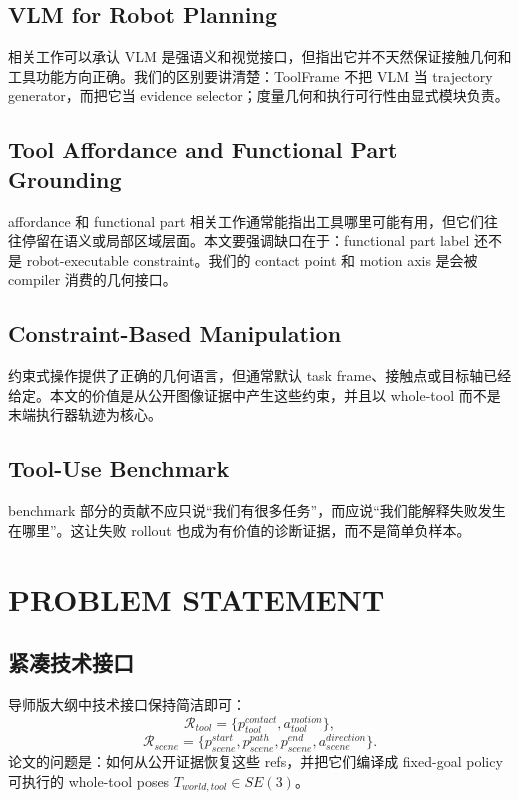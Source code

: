 \documentclass[letterpaper, 10 pt, conference]{ieeeconf}
\newcommand{\method}{ToolFrame}
\begin{document}
\subsection{VLM for Robot Planning}
相关工作可以承认 VLM 是强语义和视觉接口，但指出它并不天然保证接触几何和工具功能方向正确。我们的区别要讲清楚：\method{} 不把 VLM 当 trajectory generator，而把它当 evidence selector；度量几何和执行可行性由显式模块负责。

\subsection{Tool Affordance and Functional Part Grounding}
affordance 和 functional part 相关工作通常能指出工具哪里可能有用，但它们往往停留在语义或局部区域层面。本文要强调缺口在于：functional part label 还不是 robot-executable constraint。我们的 contact point 和 motion axis 是会被 compiler 消费的几何接口。

\subsection{Constraint-Based Manipulation}
约束式操作提供了正确的几何语言，但通常默认 task frame、接触点或目标轴已经给定。本文的价值是从公开图像证据中产生这些约束，并且以 whole-tool 而不是末端执行器轨迹为核心。

\subsection{Tool-Use Benchmark}
benchmark 部分的贡献不应只说“我们有很多任务”，而应说“我们能解释失败发生在哪里”。这让失败 rollout 也成为有价值的诊断证据，而不是简单负样本。

\section{PROBLEM STATEMENT}

\subsection{紧凑技术接口}
导师版大纲中技术接口保持简洁即可：
\begin{equation}
  \mathcal{R}_{tool} =
  \{p^{contact}_{tool}, a^{motion}_{tool}\},
\end{equation}
\begin{equation}
  \mathcal{R}_{scene} =
  \{p^{start}_{scene}, p^{path}_{scene}, p^{end}_{scene},
  a^{direction}_{scene}\}.
\end{equation}
论文的问题是：如何从公开证据恢复这些 refs，并把它们编译成 fixed-goal policy 可执行的 whole-tool poses $T_{world,tool}\in SE(3)$。
\end{document}
